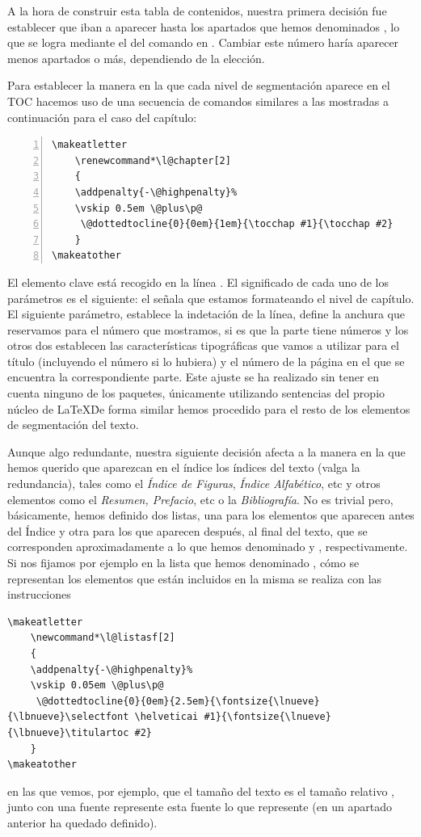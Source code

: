 A la hora de construir esta tabla de contenidos, nuestra primera decisión fue establecer que iban a aparecer hasta los apartados que hemos denominados , lo que se logra mediante el  del comando  en .  Cambiar este número haría aparecer menos apartados o más, dependiendo de la elección.

Para establecer la manera en la que cada nivel de segmentación aparece en el TOC hacemos uso de una secuencia de comandos similares a las mostradas a continuación para el caso del capítulo:
\begin{lstlisting}[frame=none, numbers=left, xleftmargin=2em]
\makeatletter
	\renewcommand*\l@chapter[2]
	{
    \addpenalty{-\@highpenalty}%
    \vskip 0.5em \@plus\p@
	 \@dottedtocline{0}{0em}{1em}{\tocchap #1}{\tocchap #2}
	}
\makeatother
\end{lstlisting}
El elemento clave está recogido en la línea . El significado de cada uno de los parámetros es el siguiente: el  señala que estamos formateando el nivel de capítulo. El siguiente parámetro, \ttcolor{0em} establece la indetación de la línea, \ttcolor{1em} define la anchura que reservamos para el número que mostramos, si es que la parte tiene números y los otros dos establecen las características tipográficas que vamos a utilizar para el título (incluyendo el número si lo hubiera) y el número de la página en el que se encuentra la correspondiente parte. Este ajuste se ha realizado sin tener en cuenta ninguno de los paquetes, únicamente utilizando sentencias del propio núcleo de \LaTeX\. De forma similar hemos procedido para el resto de los elementos de segmentación del texto.

Aunque algo redundante, nuestra siguiente decisión afecta a la manera en la que hemos querido que aparezcan en el índice los índices del texto (valga la redundancia), tales como el \emph{Índice de Figuras}, \emph{Índice Alfabético}, etc y otros elementos como el \emph{Resumen, Prefacio}, etc o la \emph{Bibliografía}. No es trivial pero, básicamente, hemos definido dos listas, una para los elementos que aparecen antes del Índice y otra para los  que aparecen después, al final del texto, que se corresponden aproximadamente a lo que hemos denominado  y , respectivamente. Si nos fijamos por ejemplo en la lista que hemos denominado , cómo se representan los elementos que están incluidos en la misma se realiza con las instrucciones
\begin{lstlisting}[frame=none]
\makeatletter
	\newcommand*\l@listasf[2]
	{
    \addpenalty{-\@highpenalty}%
    \vskip 0.05em \@plus\p@
	 \@dottedtocline{0}{0em}{2.5em}{\fontsize{\lnueve}{\lbnueve}\selectfont \helveticai #1}{\fontsize{\lnueve}{\lbnueve}\titulartoc #2}
	}
\makeatother
\end{lstlisting}
en las que vemos, por ejemplo, que el tamaño del texto es el tamaño relativo , junto con una fuente  represente esta fuente lo que represente (en un apartado anterior ha quedado definido).

